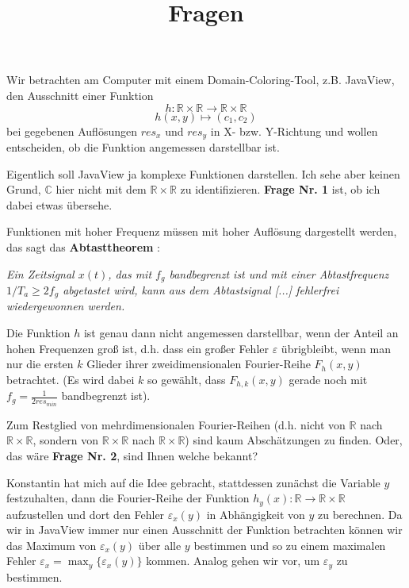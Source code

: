 \documentclass[a4paper]{article}
\begin{document}
\title{Fragen}
\date{}
\maketitle
\thispagestyle{empty}
\setlength{\parskip}{6pt}

Wir betrachten am Computer mit einem Domain-Coloring-Tool, z.B. JavaView, den Ausschnitt einer Funktion $$h: \mathbb{R} \times \mathbb{R} \rightarrow \mathbb{R} \times \mathbb{R}$$
$$h(x,y) \mapsto (c_1,c_2)$$ bei gegebenen Auflösungen $res_x$ und $res_y$  in X- bzw. Y-Richtung und wollen entscheiden, ob die Funktion angemessen darstellbar ist.

Eigentlich soll JavaView ja komplexe Funktionen darstellen. Ich sehe aber keinen Grund, $\mathbb{C}$ hier nicht mit dem $\mathbb{R} \times \mathbb{R}$ zu identifizieren. \textbf{Frage Nr. 1} ist, ob ich dabei etwas übersehe.

Funktionen mit hoher Frequenz müssen mit hoher Auflösung dargestellt werden, das sagt das \textbf{Abtasttheorem} \cite[nach][]{MuellerWichards1999}:

\textit{Ein Zeitsignal $x(t)$, das mit $f_g$ bandbegrenzt ist und mit einer Abtastfrequenz $1/T_a \geq 2 f_g$ abgetastet wird, kann aus dem Abtastsignal [...] fehlerfrei wiedergewonnen werden.}

Die Funktion $h$ ist genau dann nicht angemessen darstellbar, wenn der Anteil an hohen Frequenzen groß ist, d.h. dass ein großer Fehler $\varepsilon$ übrigbleibt, wenn man nur die ersten $k$ Glieder ihrer zweidimensionalen Fourier-Reihe $F_h(x,y)$ betrachtet. (Es wird dabei $k$ so gewählt, dass $F_{h,k}(x,y)$ gerade noch mit $f_g=\frac{1}{2res_{min}}$ bandbegrenzt ist).

Zum Restglied von mehrdimensionalen Fourier-Reihen (d.h. nicht von $\mathbb{R}$ nach $\mathbb{R} \times \mathbb{R}$, sondern von $\mathbb{R} \times \mathbb{R}$ nach $\mathbb{R} \times \mathbb{R}$) sind kaum Abschätzungen zu finden. Oder, das wäre \textbf{Frage Nr. 2}, sind Ihnen welche bekannt?

Konstantin hat mich auf die Idee gebracht, stattdessen zunächst die Variable $y$ festzuhalten, dann die Fourier-Reihe der Funktion $h_{y}(x): \mathbb{R} \rightarrow \mathbb{R} \times \mathbb{R}$ aufzustellen und dort den Fehler $\varepsilon_x(y)$ in Abhängigkeit von $y$ zu berechnen. Da wir in JavaView immer nur einen Ausschnitt der Funktion betrachten können wir das Maximum von $\varepsilon_x(y)$ über alle $y$ bestimmen und so zu einem maximalen Fehler $\varepsilon_x=\max_y \{ \varepsilon_x(y) \}$ kommen. Analog gehen wir vor, um $\varepsilon_y$ zu bestimmen.
\end{document}
